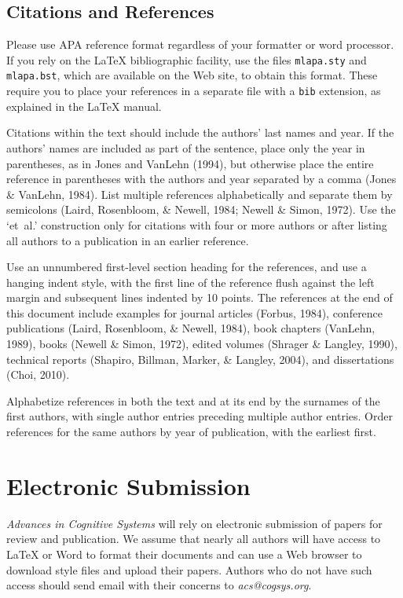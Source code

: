\documentclass[11pt,letterpaper]{article}
\begin{document}
\subsection{Citations and References} 

Please use APA reference format regardless of your formatter or word
processor. If you rely on the \LaTeX\/ bibliographic facility, use
the files {\tt mlapa.sty} and {\tt mlapa.bst}, which are available on 
the Web site, to obtain this format. These require you to place your
references in a separate file with a {\tt bib} extension, as explained
in the \LaTeX\/ manual. 

Citations within the text should include the authors' last names and
year. If the authors' names are included as part of the sentence, place 
only the year in parentheses, as in Jones and VanLehn (1994), but
otherwise place the entire reference in parentheses with the authors
and year separated by a comma (Jones \& VanLehn, 1984).
List multiple references alphabetically and separate them by semicolons 
(Laird, Rosenbloom, \& Newell, 1984; Newell \& Simon, 1972). Use the 
`et~al.'  construction only for citations with four or more authors or
after listing all authors to a publication in an earlier reference.

Use an unnumbered first-level section heading for the references, and 
use a hanging indent style, with the first line of the reference flush
against the left margin and subsequent lines indented by 10 points. 
The references at the end of this document include examples for journal
articles (Forbus, 1984), conference publications (Laird, Rosenbloom, 
\& Newell, 1984), book chapters (VanLehn, 1989), books (Newell \& Simon, 
1972), edited volumes (Shrager \& Langley, 1990), technical reports 
(Shapiro, Billman, Marker, \& Langley, 2004), and dissertations 
(Choi, 2010). 

Alphabetize references in both the text and at its end by the surnames
of the first authors, with single author entries preceding multiple
author entries. Order references for the same authors by year of
publication, with the earliest first.

\section{Electronic Submission}

{\it Advances in Cognitive Systems\/} will rely on electronic submission 
of papers for review and publication. We assume that nearly all authors 
will have access to \LaTeX\/ or Word to format their documents and can
use a Web browser to download style files and upload their papers. 
Authors who do not have such access should send email with their
concerns to {\sl acs@cogsys.org}.
\end{document}
